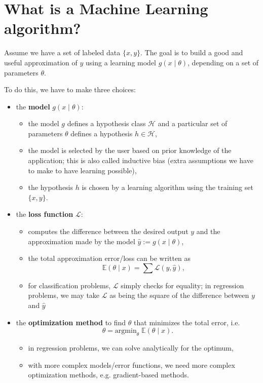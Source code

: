 \documentclass[a4paper,11pt]{report}
\newcommand{\ds}{\displaystyle}
\begin{document}
\section{What is a Machine Learning algorithm?}

Assume we have a set of labeled data $\{x, y \}$. The goal is to build a good and useful approximation of $y$ using a learning model $g(x \mid \theta)$, depending on a set of parameters $\theta$.

To do this, we have to make three choices:
\begin{itemize}
  \item the \textbf{model} $g(x \mid \theta)$:
    \begin{itemize}
      \item the model $g$ defines a hypothesis class $\mathcal{H}$ and a particular set of parameters $\theta$ defines a hypothesis $h \in \mathcal{H}$,
      \item the model is selected by the user based on prior knowledge of the application; this is also called inductive bias (extra assumptions we have to make to have learning possible),
      \item the hypothesis $h$ is chosen by a learning algorithm using the training set $\{x, y \}$.
    \end{itemize}
  \item the \textbf{loss function} $\mathcal{L}$:
    \begin{itemize}
      \item computes the difference between the desired output $y$ and the approximation made by the model $\hat{y} := g(x \mid \theta)$,
      \item the total approximation error/loss can be written as $$\mathbb{E}(\theta \mid x) = \ds\sum{\mathcal{L}(y, \hat{y})},$$
      \item for classification problems, $\mathcal{L}$ simply checks for equality; in regression problems, we may take $\mathcal{L}$ as being the square of the difference between $y$  and $\hat{y}$
    \end{itemize}
  \item the \textbf{optimization method} to find $\theta$ that minimizes the total error, i.e. $$ \theta = \textrm{argmin}_{\theta}\; \mathbb{E}(\theta \mid x).$$
    \begin{itemize}
      \item in regression problems, we can solve analytically for the optimum,
      \item with more complex models/error functions, we need more complex optimization methods, e.g. gradient-based methods.
    \end{itemize}
\end{itemize}
\end{document}
